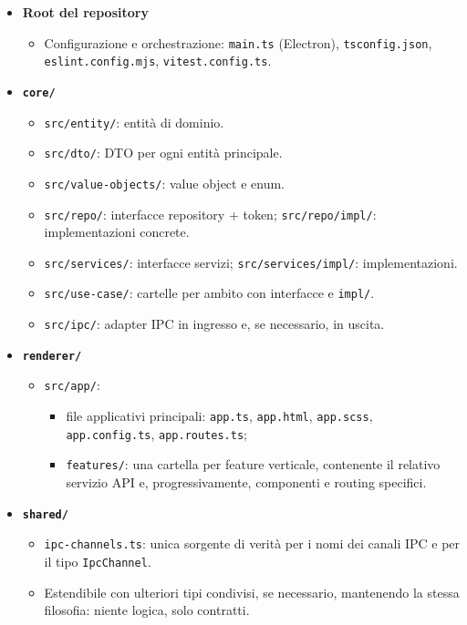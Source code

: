 \documentclass[a4paper,12pt]{article}
\begin{document}
\begin{itemize}
  \item \textbf{Root del repository}
    \begin{itemize}
      \item Configurazione e orchestrazione: \texttt{main.ts} (Electron), \texttt{tsconfig.json}, \texttt{eslint.config.mjs}, \texttt{vitest.config.ts}.
    \end{itemize}

  \item \textbf{\texttt{core/}}
    \begin{itemize}
      \item \texttt{src/entity/}: entità di dominio.
      \item \texttt{src/dto/}: DTO per ogni entità principale.
      \item \texttt{src/value-objects/}: value object e enum.
      \item \texttt{src/repo/}: interfacce repository + token; \texttt{src/repo/impl/}: implementazioni concrete.
      \item \texttt{src/services/}: interfacce servizi; \texttt{src/services/impl/}: implementazioni.
      \item \texttt{src/use-case/}: cartelle per ambito con interfacce e \texttt{impl/}.
      \item \texttt{src/ipc/}: adapter IPC in ingresso e, se necessario, in uscita.
    \end{itemize}

  \item \textbf{\texttt{renderer/}}
    \begin{itemize}
      \item \texttt{src/app/}:
        \begin{itemize}
          \item file applicativi principali: \texttt{app.ts}, \texttt{app.html}, \texttt{app.scss},\\ \texttt{app.config.ts}, \texttt{app.routes.ts};
          \item \texttt{features/}: una cartella per feature verticale, contenente il relativo servizio API e, progressivamente, componenti e routing specifici.
        \end{itemize}
    \end{itemize}

  \item \textbf{\texttt{shared/}}
    \begin{itemize}
      \item \texttt{ipc-channels.ts}: unica sorgente di verità per i nomi dei canali IPC e per il tipo \texttt{IpcChannel}.
      \item Estendibile con ulteriori tipi condivisi, se necessario, mantenendo la stessa filosofia: niente logica, solo contratti.
    \end{itemize}
\end{itemize}
\end{document}
